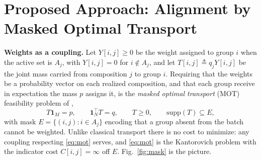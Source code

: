 \section{Proposed Approach: Alignment by Masked Optimal Transport}
\label{sec:gavot}

\noindent\textbf{Weights as a coupling.}
Let $Y[i,j]\ge 0$ be the weight assigned to group $i$ when the active set is
$A_j$, with $Y[i,j]=0$ for $i\notin A_j$, and let $T[i,j]\triangleq q_jY[i,j]$
be the joint mass carried from composition $j$ to group $i$. Requiring that
the weights be a probability vector on each realized composition, and that
each group receive in expectation the mass $p$ assigns it, is the
\emph{masked optimal transport} (MOT) feasibility problem of
\cite{rahimi2025fedavot},
\begin{equation}
T\mathbf{1}_M=p,\qquad \mathbf{1}_N^\top T=q,\qquad T\ge 0,
\qquad \mathrm{supp}(T)\subseteq E,
\label{eq:mot}
\end{equation}
with mask $E=\{(i,j): i\in A_j\}$ encoding that a group absent from the batch
cannot be weighted. Unlike classical transport
\cite{villani2009,peyre2019} there is no cost to minimize: any coupling
respecting \eqref{eq:mot} serves, and \eqref{eq:mot} is the Kantorovich
problem with the indicator cost $C[i,j]=\infty$ off $E$. Fig.~\ref{fig:mask}
is the picture.

